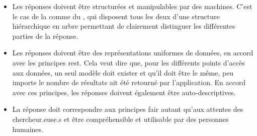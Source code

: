 \begin{itemize}
	\item Les réponses doivent être structurées et manipulables par des machines. C'est le cas de la \tei{} comme du \json{}, qui disposent tous les deux d'une structure hiérarchique en arbre permettant de clairement distinguer les différentes parties de la réponse.
	\item Les réponses doivent être des représentations uniformes de données, en accord avec les principes \gls{rest}. Cela veut dire que, pour les différents points d'accès aux données, un seul modèle doit exister et qu'il doit être le même, peu importe le nombre de résultats ait été retourné par l'application. En accord avec ces principes, les réponses doivent également être auto-descriptives.
	\item La réponse doit correspondre aux principes \gls{fair} autant qu'aux attentes des chercheur.euse.s et être compréhensible et utilisable par des personnes humaines. 
\end{itemize}

